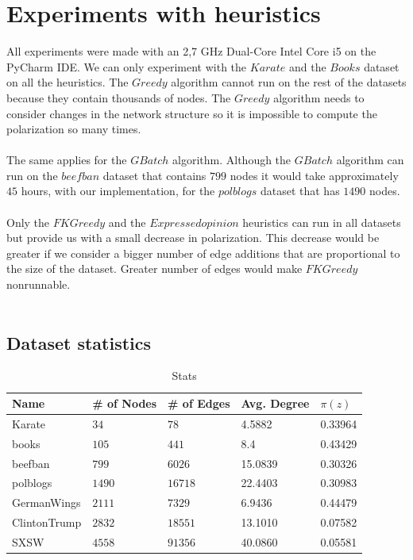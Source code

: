 \section{Experiments with heuristics}
\label{sec:experimHeuristics}

All experiments were made with an 2,7 GHz Dual-Core Intel Core i5 on the PyCharm IDE. We can only experiment with the $Karate$ and the $Books$ dataset on all the heuristics. The $Greedy$ algorithm cannot run on the rest of the datasets because they contain thousands of nodes. The $Greedy$ algorithm needs to consider changes in the network structure so it is impossible to compute the polarization so many times.
\\
\\ 
The same applies for the $GBatch$ algorithm. Although the $GBatch$ algorithm can run on the $beefban$ dataset that contains $799$ nodes it would take approximately $45$ hours, with our implementation, for the $polblogs$ dataset that has $1490$ nodes.
\\
\\
Only the $FKGreedy$ and the $Expressed opinion$ heuristics can run in all datasets but provide us with a small decrease in polarization. This decrease would be greater if we consider a bigger number of edge additions that are proportional to the size of the dataset. Greater number of edges would make $FKGreedy$ nonrunnable.
\\
\\
\clearpage

\subsection{Dataset statistics}

\begin{table}[H]
 \centering
 \caption{Stats}
 \label{tab:statistics}
 \begin{tabular}{| l || l | l | l | l |}
 \hline
  Name & \# of Nodes & \# of Edges & Avg. Degree & $\pi(z)$\\
  \hline
  \hline
  Karate & $34$ & $78$ & 4.5882 &  0.33964\\
  \hline
    books & $105$ & $441$ & 8.4 &  0.43429\\
  \hline
    beefban & $799$ & $6026$ & 15.0839 &  0.30326\\
  \hline
  polblogs & $1490$ & $16718$ & 22.4403 &  0.30983\\
  \hline
  GermanWings & $2111$ & $7329$ & 6.9436 &  0.44479\\
  \hline
  ClintonTrump & $2832$ & $18551$ & 13.1010 &  0.07582\\
  \hline
  SXSW & $4558$ & $91356$ & 40.0860 &  0.05581\\
  \hline
 \end{tabular}
 \end{table}



